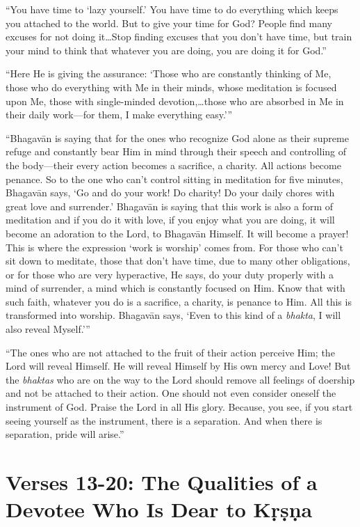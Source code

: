 \documentclass[12pt, twoside, openright]{memoir}
\begin{document}
\enquote{You have time to \enquote{lazy yourself.} You have time to do everything which keeps you attached to the world. But to give your time for God? People find many excuses for not doing it\ldots Stop finding excuses that you don’t have time, but train your mind to think that whatever you are doing, you are doing it for God.}

\enquote{Here He is giving the assurance: \enquote{Those who are constantly thinking of Me, those who do everything with Me in their minds, whose meditation is focused upon Me, those with single-minded devotion,\ldots those who are absorbed in Me in their daily work---for them, I make everything easy.}}

\enquote{Bhagavān is saying that for the ones who recognize God alone as their supreme refuge and constantly bear Him in mind through their speech and controlling of the body---their every action becomes a sacrifice, a charity. All actions become penance. So to the one who can’t control sitting in meditation for five minutes, Bhagavān says, \enquote{Go and do your work! Do charity! Do your daily chores with great love and surrender.} Bhagavān is saying that this work is also a form of meditation and if you do it with love, if you enjoy what you are doing, it will become an adoration to the Lord, to Bhagavān Himself. It will become a prayer! This is where the expression \enquote{work is worship} comes from. For those who can’t sit down to meditate, those that don’t have time, due to many other obligations, or for those who are very hyperactive, He says, do your duty properly with a mind of surrender, a mind which is constantly focused on Him. Know that with such faith, whatever you do is a sacrifice, a charity, is penance to Him. All this is transformed into worship. Bhagavān says, \enquote{Even to this kind of a \textit{bhakta}, I will also reveal Myself.}}

\enquote{The ones who are not attached to the fruit of their action perceive Him; the Lord will reveal Himself. He will reveal Himself by His own mercy and Love! But the \textit{bhaktas} who are on the way to the Lord should remove all feelings of doership and not be attached to their action. One should not even consider oneself the instrument of God. Praise the Lord in all His glory. Because, you see, if you start seeing yourself as the instrument, there is a separation. And when there is separation, pride will arise.}


\section{Verses 13-20: The Qualities of a Devotee Who Is Dear to Kṛṣṇa}\label{sec-verses-13-20-the-qualities-of-a-devotee-who-is-dear-to-krsna}
\end{document}

